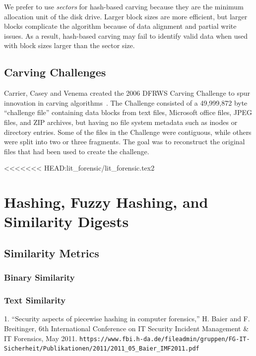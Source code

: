 \documentclass[11pt,letter]{article}
\begin{document}
We prefer to use \emph{sectors} for hash-based
carving because they are the minimum allocation unit of the disk
drive. Larger block sizes are more efficient, but larger blocks
complicate the algorithm because of data alignment and partial write
issues. As a result, hash-based carving may fail to identify valid
data when used with block sizes larger than the sector size.


\section{Carving Challenges}

Carrier, Casey and Venema created the 2006 DFRWS Carving Challenge
to spur innovation in carving
algorithms~\cite{dfrws2006-challenge}. The Challenge consisted of a
49,999,872 byte ``challenge file'' containing data blocks from text
files, Microsoft office files, JPEG files, and ZIP 
archives, but having no file system metadata such as inodes or
directory entries. Some of the files in the Challenge were
contiguous, while others were split into two or three fragments. The
goal was to reconstruct the original files
that had been used to create the challenge. 




<<<<<<< HEAD:lit_forensic/lit_forensic.tex2
\setcounter{chapter}{5}        %
\chapter{Hashing, Fuzzy Hashing, and Similarity Digests}

\section{Similarity Metrics}
\subsection{Binary Similarity}
\cite{dfrws2011:VassilRoussev}
\subsection{Text Similarity}
\cite{dfrws2011:ClayShieldsAndOphirFriederAndMarkMaloof}


1. “Security aspects of piecewise hashing in computer forensics,”
H. Baier and F. Breitinger, 6th International Conference on IT
Security Incident Management \& IT Forensics, May 2011. 
\verb+https://www.fbi.h-da.de/fileadmin/gruppen/FG-IT-Sicherheit/Publikationen/2011/2011_05_Baier_IMF2011.pdf+
\end{document}
